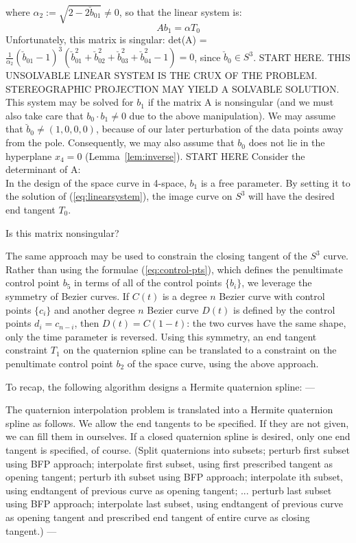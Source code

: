 \documentclass[12pt]{article}
\begin{document}
where $\alpha_2 := \sqrt{2-2\breve{b}_{01}} \neq 0$,
so that the linear system is:
\[
Ab_1 = \alpha T_0
\]
Unfortunately, this matrix is singular:
det(A) = $\frac{1}{\alpha_2}(\breve{b}_{01} - 1)^3 
(\breve{b}_{01}^2 + \breve{b}_{02}^2 + \breve{b}_{03}^2 + \breve{b}_{04}^2 - 1) = 0$,
since $\breve{b}_0 \in S^3$.
START HERE.
THIS UNSOLVABLE LINEAR SYSTEM IS THE CRUX OF THE PROBLEM.
STEREOGRAPHIC PROJECTION MAY YIELD A SOLVABLE SOLUTION.
This system may be solved for $b_1$ if the matrix A is nonsingular
(and we must also take care that $b_0 \cdot b_1 \neq 0$ due to the above manipulation).
We may assume that $\breve{b}_0 \neq (1,0,0,0)$, because of our later perturbation
of the data points away from the pole.
Consequently, we may also assume that $b_0$ does not lie in the hyperplane $x_4=0$
(Lemma~\ref{lem:inverse}).
START HERE
Consider the determinant of A:
\[
\]
In the design of the space curve in 4-space,
$b_1$ is a free parameter.
By setting it to the solution of (\ref{eq:linearsystem}),
the image curve on $S^3$ will have the desired end tangent $T_0$.

Is this matrix nonsingular?

The same approach may be used to constrain the closing tangent of the $S^3$ curve.
Rather than using the formulae (\ref{eq:control-pts}), 
which defines the penultimate control point $b_{5}$ in terms of 
all of the control points $\{b_i\}$,
we leverage the symmetry of Bezier curves.
If $C(t)$ is a degree $n$ Bezier curve with control points $\{c_i\}$ and 
another degree $n$ Bezier curve $D(t)$ is defined by the control points $d_i = c_{n-i}$,
then $D(t) = C(1-t)$: the two curves have the same shape, only the time parameter 
is reversed.
Using this symmetry, an end tangent constraint $T_1$ on the quaternion spline
can be translated to a constraint on the penultimate control point $b_{2}$ 
of the space curve, using the above approach.

To recap, the following algorithm designs a Hermite quaternion spline:
---

The quaternion interpolation problem is translated into a Hermite quaternion spline
as follows.
We allow the end tangents to be specified.  If they are not given, 
we can fill them in ourselves.
If a closed quaternion spline is desired, only one end tangent is specified, of course.
(Split quaternions into subsets; perturb first subset using BFP approach;
interpolate first subset, using first prescribed tangent as opening tangent;
perturb ith subset using BFP approach;
interpolate ith subset, using endtangent of previous curve as opening tangent;
...
perturb last subset using BFP approach;
interpolate last subset, using endtangent of previous curve as opening tangent
and prescribed end tangent of entire curve as closing tangent.)
---
\end{document}
